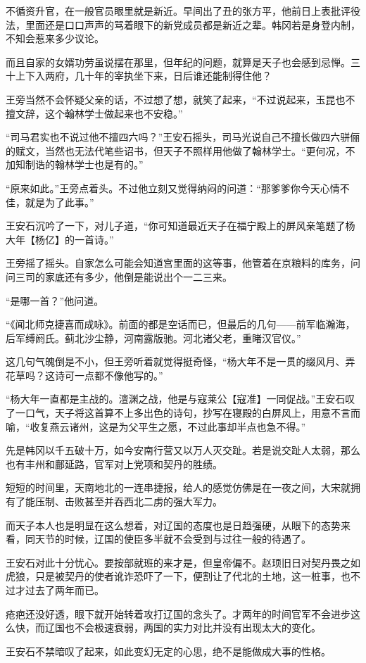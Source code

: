不循资升官，在一般官员眼里就是新近。早间出了丑的张方平，他前日上表批评役法，里面还是口口声声的骂着眼下的新党成员都是新近之辈。韩冈若是身登内制，不知会惹来多少议论。

而且自家的女婿功劳虽说摆在那里，但年纪的问题，就算是天子也会感到忌惮。三十上下入两府，几十年的宰执坐下来，日后谁还能制得住他？

王旁当然不会怀疑父亲的话，不过想了想，就笑了起来，“不过说起来，玉昆也不擅文辞，这个翰林学士做起来也不安稳。”

“司马君实也不说过他不擅四六吗？”王安石摇头，司马光说自己不擅长做四六骈俪的赋文，当然也无法代笔些诏书，但天子不照样用他做了翰林学士。“更何况，不加知制诰的翰林学士也是有的。”

“原来如此。”王旁点着头。不过他立刻又觉得纳闷的问道：“那爹爹你今天心情不佳，就是为了此事。”

王安石沉吟了一下，对儿子道，“你可知道最近天子在福宁殿上的屏风亲笔题了杨大年【杨亿】的一首诗。”

王旁摇了摇头。自家怎么可能会知道宫里面的这等事，他管着在京粮料的库务，问问三司的家底还有多少，他倒是能说出个一二三来。

“是哪一首？”他问道。

“《闻北师克捷喜而成咏》。前面的都是空话而已，但最后的几句——前军临瀚海，后军缚阏氏。蓟北沙尘静，河南露版驰。河北诸父老，重睹汉官仪。”

这几句气魄倒是不小，但王旁听着就觉得挺奇怪，“杨大年不是一贯的缀风月、弄花草吗？这诗可一点都不像他写的。”

“杨大年一直都是主战的。澶渊之战，他是与寇莱公【寇准】一同促战。”王安石叹了一口气，天子将这首算不上多出色的诗句，抄写在寝殿的白屏风上，用意不言而喻，“收复燕云诸州，这是为父平生之愿，不过此事却半点也急不得。”

先是韩冈以千五破十万，如今安南行营又以万人灭交趾。若是说交趾人太弱，那么也有丰州和鄜延路，官军对上党项和契丹的胜绩。

短短的时间里，天南地北的一连串捷报，给人的感觉仿佛是在一夜之间，大宋就拥有了能压制、击败甚至并吞西北二虏的强大军力。

而天子本人也是明显在这么想着，对辽国的态度也是日趋强硬，从眼下的态势来看，同天节的时候，辽国的使臣多半就不会受到与过往一般的待遇了。

王安石对此十分忧心。要按部就班的来才是，但皇帝偏不。赵顼旧日对契丹畏之如虎狼，只是被契丹的使者讹诈恐吓了一下，便割让了代北的土地，这一桩事，也不过才过去了两年而已。

疮疤还没好透，眼下就开始转着攻打辽国的念头了。才两年的时间官军不会进步这么快，而辽国也不会极速衰弱，两国的实力对比并没有出现太大的变化。

王安石不禁暗叹了起来，如此变幻无定的心思，绝不是能做成大事的性格。

